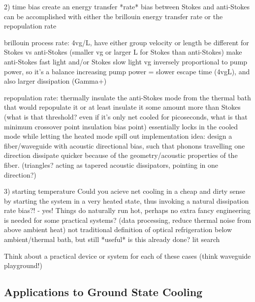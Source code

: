 2) time bias
     create an energy transfer *rate* bias between Stokes and anti-Stokes
     can be accomplished with either the brillouin energy transfer rate or the repopulation rate

       brillouin process rate:
         4vg/L, have either group velocity or length be different for Stokes vs anti-Stokes (smaller vg or larger L for Stokes than anti-Stokes)
         make anti-Stokes fast light and/or Stokes slow light
         vg inversely proportional to pump power, so it's a balance
           increasing pump power = slower escape time (4vgL), and also larger dissipation (Gamma+)

       repopulation rate:
         thermally insulate the anti-Stokes mode from the thermal bath that would repopulate it
         or at least insulate it some amount more than Stokes (what is that threshold? even if it's only net cooled for picoseconds, what is that minimum crossover point insulation bias point)
         essentially locks in the cooled mode while letting the heated mode spill out
         implementation idea:
           design a fiber/waveguide with acoustic directional bias, such that phonons travelling one direction dissipate quicker because of the geometry/acoustic properties of the fiber. (triangles? acting as tapered acoustic dissipators, pointing in one direction?)

3) starting temperature
     Could you acieve net cooling in a cheap and dirty sense by starting the system in a very heated state, thus invoking a natural dissipation rate bias?! - yes!
     Things do naturally run hot, perhaps no extra fancy engineering is needed for some practical systems? (data processing, reduce thermal noise from above ambient heat)
     not traditional definition of optical refrigeration below ambient/thermal bath, but still *useful*
     is this already done? lit search

Think about a practical device or system for each of these cases (think waveguide playground!)

\subsection{Applications to Ground State Cooling}
\label{Cooling:subsec:ApplicationstoGroundStateCooling}
